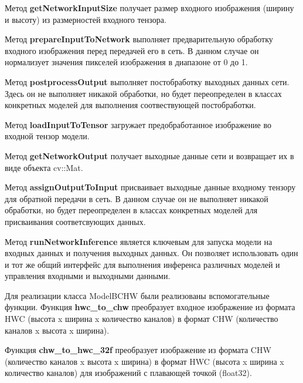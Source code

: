 \documentclass[a4paper,14pt]{extreport}
\begin{document}
        Метод \hypertarget{getSize}{}\textbf{getNetworkInputSize} получает размер входного изображения (ширину и высоту) из размерностей входного тензора.

        Метод \textbf{prepareInputToNetwork} выполняет предварительную обработку входного изображения перед передачей его в сеть. В данном случае он нормализует значения пикселей изображения в диапазоне от 0 до 1.

        Метод \hypertarget{postprocess}{}\textbf{postprocessOutput} выполняет постобработку выходных данных сети. Здесь он не выполняет никакой обработки, но будет переопределен в классах конкретных моделей для выполнения соотвествующей постобработки.

        Метод \textbf{loadInputToTensor} загружает предобработанное изображение во входной тензор модели.

        Метод \hypertarget{getOutput}{}\textbf{getNetworkOutput} получает выходные данные сети и возвращает их в виде объекта cv::Mat.
        
        Метод \hypertarget{assign}{}\textbf{assignOutputToInput} присваивает выходные данные входному тензору для обратной передачи в сеть. В данном случае он не выполняет никакой обработки, но будет переопределен в классах конкретных моделей для присваивания соответсвующих данных.

        Метод \hypertarget{runInference}{}\textbf{runNetworkInference} является ключевым для запуска модели на входных данных и получения выходных данных. Он позволяет использовать один и тот же общий интерфейс для выполнения инференса различных моделей и управления входными и выходными данными.
        

        Для реализации класса ModelBCHW были реализованы вспомогательные функции.
        Функция \hypertarget{hwc_to_chw}{}\textbf{hwc\_to\_chw} преобразует входное изображение из формата HWC (высота x ширина x количество каналов) в формат CHW (количество каналов x высота x ширина).
        

        Функция \hypertarget{chw_to_hwc_32f}{}\textbf{chw\_to\_hwc\_32f} преобразует изображение из формата CHW (количество каналов x высота x ширина) в формат HWC (высота x ширина x количество каналов) для изображений с плавающей точкой (float32).
        
\end{document}
